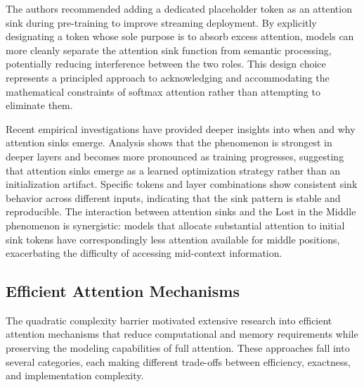 The authors recommended adding a dedicated placeholder token as an attention sink during pre-training to improve streaming deployment. By explicitly designating a token whose sole purpose is to absorb excess attention, models can more cleanly separate the attention sink function from semantic processing, potentially reducing interference between the two roles. This design choice represents a principled approach to acknowledging and accommodating the mathematical constraints of softmax attention rather than attempting to eliminate them.

Recent empirical investigations have provided deeper insights into when and why attention sinks emerge. Analysis shows that the phenomenon is strongest in deeper layers and becomes more pronounced as training progresses, suggesting that attention sinks emerge as a learned optimization strategy rather than an initialization artifact. Specific tokens and layer combinations show consistent sink behavior across different inputs, indicating that the sink pattern is stable and reproducible. The interaction between attention sinks and the Lost in the Middle phenomenon is synergistic: models that allocate substantial attention to initial sink tokens have correspondingly less attention available for middle positions, exacerbating the difficulty of accessing mid-context information.

\subsection{Efficient Attention Mechanisms}

The quadratic complexity barrier motivated extensive research into efficient attention mechanisms that reduce computational and memory requirements while preserving the modeling capabilities of full attention. These approaches fall into several categories, each making different trade-offs between efficiency, exactness, and implementation complexity.

